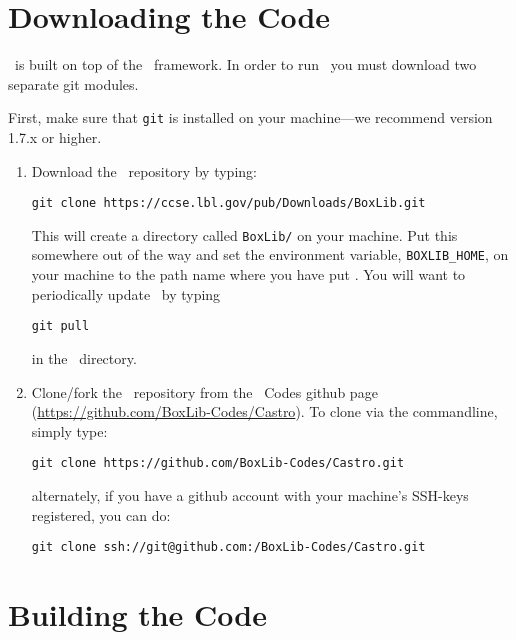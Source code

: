 
\section{Downloading the Code}

\castro\ is built on top of the \boxlib\ framework.  In order to run
\castro\, you must download two separate git modules.

\vspace{.1in}

\noindent First, make sure that {\tt git} is installed on your machine---we recommend version 1.7.x or higher.

\vspace{.1in}

\begin{enumerate}

\item Download the \boxlib\ repository by typing: 
\begin{verbatim}
git clone https://ccse.lbl.gov/pub/Downloads/BoxLib.git
\end{verbatim}

This will create a directory called {\tt BoxLib/} on your machine.
Put this somewhere out of the way and set the environment variable,
{\tt BOXLIB\_HOME}, on your machine to the path name where you have
put \boxlib.  You will want to periodically update \boxlib\ by typing
\begin{verbatim}
git pull
\end{verbatim}
in the \boxlib\ directory.  

\item Clone/fork the \castro\ repository from the \boxlib\ Codes {\sf
  github} page (\url{https://github.com/BoxLib-Codes/Castro}).  To
  clone via the commandline, simply type:
\begin{verbatim}
git clone https://github.com/BoxLib-Codes/Castro.git
\end{verbatim}
alternately, if you have a {\sf github} account with your
machine's SSH-keys registered, you can do:
\begin{verbatim}
git clone ssh://git@github.com:/BoxLib-Codes/Castro.git
\end{verbatim}

\end{enumerate}


\section{Building the Code}

